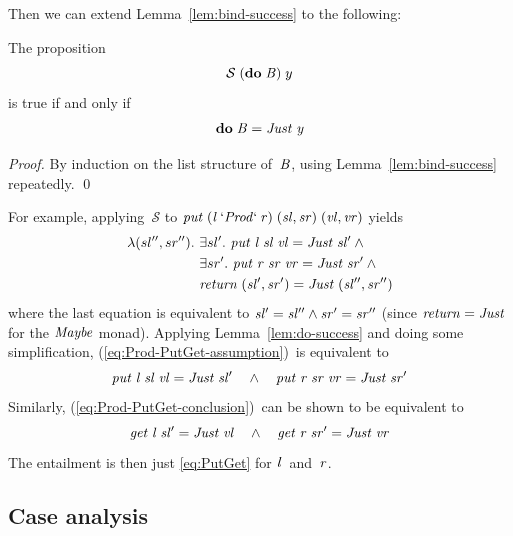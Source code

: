 Then we can extend Lemma~\ref{lem:bind-success} to the following:
\begin{lemma} \label{lem:do-success}
The proposition
\[ \mathcal S\;(\mathbf{do}\;\mathit{B})\;y \]
is true if and only if
\[ \mathbf{do}\;\mathit{B} = \mathit{Just}\;\mathit{y} \]
\end{lemma}
\begin{proof}
By induction on the list structure of~\ensuremath{\Conid{B}}, using Lemma~\ref{lem:bind-success} repeatedly. \qed
\end{proof}
For example, applying~$\mathcal S$ to \ensuremath{\Varid{put}\;(\Varid{l}\mathbin{`\Conid{Prod}`}\Varid{r})\;(\Varid{sl},\Varid{sr})\;(\Varid{vl},\Varid{vr})} yields
\begin{align*}
\lambda (sl'', sr'').\
&\exists sl'.\ \ensuremath{\Varid{put}\;\Varid{l}\;\Varid{sl}\;\Varid{vl}\mathrel{=}\Conid{Just}\;\Varid{sl'}} \wedge {} \\
&\exists sr'.\ \ensuremath{\Varid{put}\;\Varid{r}\;\Varid{sr}\;\Varid{vr}\mathrel{=}\Conid{Just}\;\Varid{sr'}} \wedge {} \\
&\ensuremath{\Varid{return}\;(\Varid{sl'},\Varid{sr'})\mathrel{=}\Conid{Just}\;(\Varid{sl''},\Varid{sr''})}
\end{align*}
where the last equation is equivalent to $\mathit{sl'}\mathrel{=}\mathit{sl''} \wedge \mathit{sr'}\mathrel{=}\mathit{sr''}$ (since \ensuremath{\Varid{return}\mathrel{=}\Conid{Just}} for the \ensuremath{\Conid{Maybe}} monad).
Applying Lemma~\ref{lem:do-success} and doing some simplification, (\ref{eq:Prod-PutGet-assumption})~is equivalent to
\[ \mathit{put}\;\mathit{l}\;\mathit{sl}\;\mathit{vl}\mathrel{=}\mathit{Just}\;\mathit{sl'} \quad\wedge\quad \mathit{put}\;\mathit{r}\;\mathit{sr}\;\mathit{vr}\mathrel{=}\mathit{Just}\;\mathit{sr'} \]
Similarly, (\ref{eq:Prod-PutGet-conclusion})~can be shown to be equivalent to
\[ \mathit{get}\;\mathit{l}\;\mathit{sl'}\mathrel{=}\mathit{Just}\;\mathit{vl} \quad\wedge\quad \mathit{get}\;\mathit{r}\;\mathit{sr'}\mathrel{=}\mathit{Just}\;\mathit{vr} \]
The entailment is then just \ref{eq:PutGet} for \ensuremath{\Varid{l}}~and~\ensuremath{\Varid{r}}.

\subsection{Case analysis}

